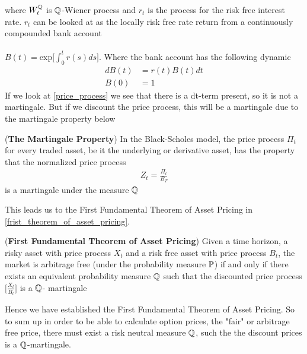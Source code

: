 where $W_{t}^{\mathbb{Q}}$ is $\mathbb{Q}$-Wiener process and  $r_t$ is the process for the risk free interest rate. $r_t$ can be looked at as the locally risk free rate return 
from a continuously compounded bank account
\\\\
$B(t)= \text{exp} \Big[\int_{0}^{t}r(s)ds \Big]$.
Where the bank account has the following dynamic
\begin{align}
    dB(t) &= r(t)B(t) dt \label{bank1}\\
    B(0) & = 1 \label{bank2}
\end{align}
If we look at \autoref{price_process} we see that there is a dt-term present, so it is not a martingale.
But if we discount the price process, this will be a martingale due to the martingale property below
\begin{proposition}
    (\textbf{The Martingale Property}) In the Black-Scholes model, the price process $\Pi_t$
    for every traded asset, be it the underlying or derivative asset, has the property that the normalized price process
    \begin{align*}
        Z_t = \frac{\Pi_t}{B_T}
    \end{align*}
    is a martingale under the measure $\mathbb{Q}$ \cite{Bjork}
\end{proposition}
\noindent 
This leads us to the First Fundamental Theorem of Asset Pricing in \autoref{frist_theorem_of_asset_pricing}.
\begin{theorem}
    (\textbf{First Fundamental Theorem of Asset Pricing})
    Given a time horizon, a risky asset with price process $X_t$ and a
    risk free asset with price process $B_t$, the market is arbitrage free 
    (under the probability measure $\mathbb{P}$) if and only if there exists an 
    equivalent probability measure $\mathbb{Q}$ such that the discounted price process
    $\Big[\frac{X_t}{B_t}\Big]$  is a $\mathbb{Q}$- martingale \cite{Bjork}
    \label{frist_theorem_of_asset_pricing}
\end{theorem}
\noindent 
Hence we have established the First Fundamental Theorem of Asset Pricing. So to sum up in order to be able to calculate
option prices, the "fair" or arbitrage free price, there must exist a risk neutral measure $\mathbb{Q}$, such the the discount prices
is a $\mathbb{Q}$-martingale. 
